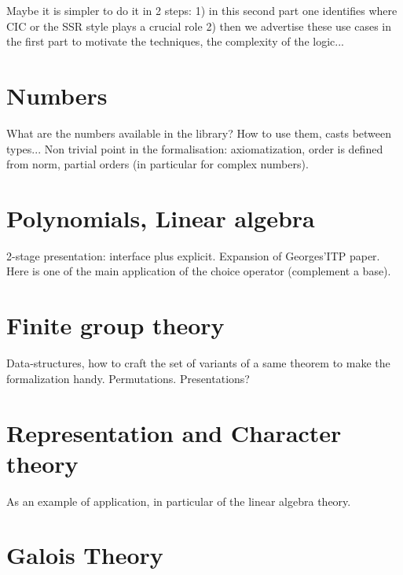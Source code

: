 \documentclass{book}
\begin{document}
Maybe it is simpler to do it in 2 steps:
1) in this second part one identifies where CIC or the SSR style plays a
   crucial role
2) then we advertise these use cases in the first part to motivate
   the techniques, the complexity of the logic...

\chapter{Numbers}

What are the numbers available in the library? How to use them, casts
between types... Non trivial point in the formalisation:
axiomatization, order is defined from norm, partial orders (in
particular for complex numbers).


\chapter{Polynomials, Linear algebra}

2-stage presentation: interface plus explicit. Expansion of
Georges'ITP paper. Here is one of the main application of the choice
operator (complement a base).


\chapter{Finite group theory}

Data-structures, how to craft the set of variants of a same theorem to
make the formalization handy. Permutations. Presentations?

\chapter{Representation and Character theory}

As an example of application, in particular of the linear algebra
theory.

\chapter{Galois Theory}


% 

\end{document}
